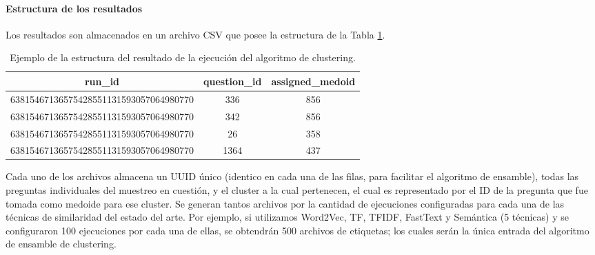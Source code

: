 \paragraph{Estructura de los resultados}
Los resultados son almacenados en un archivo CSV que posee la estructura de la Tabla \ref{tab:salida-clustering}.
\begin{table}[h!]
	\footnotesize
	\begin{tabularx}{\textwidth}{ccc}
		\toprule
		\textbf{run\_id}                       & \textbf{question\_id} & \textbf{assigned\_medoid} \\
		\midrule
		63815467136575428551131593057064980770 & 336 & 856  \\
		63815467136575428551131593057064980770 & 342& 856 \\
		63815467136575428551131593057064980770 & 26 & 358 \\
		63815467136575428551131593057064980770 & 1364 & 437 \\
		\bottomrule
	\end{tabularx}
	\caption{Ejemplo de la estructura del resultado de la ejecución del algoritmo de clustering.}
	\label{tab:salida-clustering}
\end{table}
Cada uno de los archivos almacena un UUID único (identico en cada una de las filas, para facilitar el algoritmo de ensamble), todas las preguntas individuales del muestreo en cuestión, y el cluster a la cual pertenecen, el cual es representado por el ID de la pregunta que fue tomada como medoide para ese cluster. Se generan tantos archivos por la cantidad de ejecuciones configuradas para cada una de las técnicas de similaridad del estado del arte. Por ejemplo, si utilizamos Word2Vec, TF, TFIDF, FastText y Semántica (5 técnicas) y se configuraron 100 ejecuciones por cada una de ellas, se obtendrán 500 archivos de etiquetas; los cuales serán la única entrada del algoritmo de ensamble de clustering.





